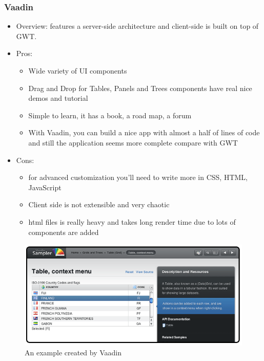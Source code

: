 \documentclass[14pt,a4paper]{extreport}
\begin{document}
		\subsubsection{Vaadin}
			\begin{itemize}
			\item Overview: features a server-side architecture and client-side is built on top of GWT.
				\item Pros: 
					\begin{itemize}
						\item Wide variety of UI components
						\item Drag and Drop for Tables, Panels and Trees components have real nice demos and tutorial
						\item Simple to learn, it has a book, a road map, a forum
						\item With Vaadin, you can build a nice app with almost a half of lines of code and still the application seems more complete compare with GWT
						
					\end{itemize}
				\item Cons:
					\begin{itemize}
						\item for advanced customization you'll need to write more in CSS, HTML, JavaScript
						\item Client side is not extensible and very chaotic
						\item html files is really heavy and takes long render time due to lots of components are added
						
					\end{itemize}
			\end{itemize}
			\begin{figure}
				\begin{center}
					\includegraphics[scale=1.1]{Vaadin.png}
					\caption{An example created by Vaadin}
				\end{center}
			\end{figure}
\end{document}
